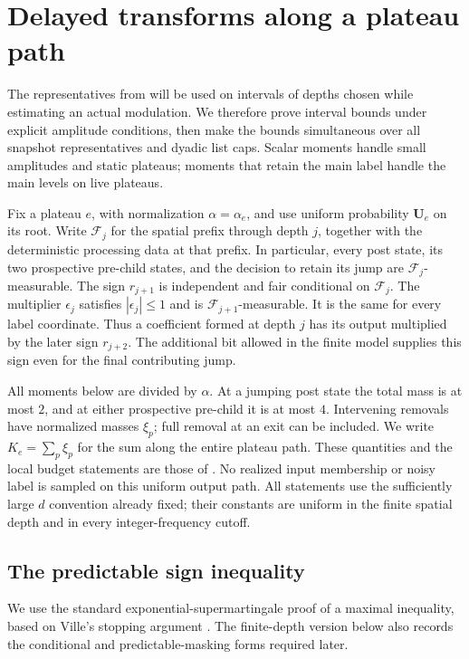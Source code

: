 \section{Delayed transforms along a plateau path}
\label{sec:paths}

The representatives from  will be used on intervals of
depths chosen while estimating an actual modulation. We therefore prove
interval bounds under explicit amplitude conditions, then make the bounds
simultaneous over all snapshot representatives and dyadic list caps.
Scalar moments handle small amplitudes and static plateaus; moments that
retain the main label handle the main levels on live plateaus.

Fix a plateau $e$, with normalization $\alpha=\alpha_e$, and use uniform
probability $\mathbf U_e$ on its root.  Write $\mathcal F_j$ for the spatial
prefix through depth $j$, together with the deterministic processing data at
that prefix.  In particular, every post state, its two prospective pre-child
states, and the decision to retain its jump are $\mathcal F_j$-measurable.
The sign $r_{j+1}$ is independent and fair conditional on $\mathcal F_j$.
The multiplier $\epsilon_j$ satisfies $|\epsilon_j|\le1$ and is
$\mathcal F_{j+1}$-measurable.  It is the same for every label coordinate.
Thus a coefficient formed at depth $j$ has its output multiplied by the
later sign $r_{j+2}$.  The additional bit allowed in the finite model supplies
this sign even for the final contributing jump.

All moments below are divided by $\alpha$.  At a jumping post state the
total mass is at most $2$, and at either prospective pre-child it is at
most $4$.  Intervening removals have normalized masses $\xi_p$; full removal
at an exit can be included.  We write $K_e=\sum_p\xi_p$ for the sum along
the entire plateau path.  These quantities and the local budget statements
are those of .  No realized input membership or
noisy label is sampled on this uniform output path.
All statements use the sufficiently large $d$ convention already fixed;
their constants are uniform in the finite spatial depth and in every
integer-frequency cutoff.

\subsection{The predictable sign inequality}

We use the standard exponential-supermartingale proof of a maximal
inequality, based on Ville's stopping argument
\cite[Chapter~V, first section, Theorem~1, pp.~84--85]{Ville1939}.
The finite-depth version below also records the conditional and
predictable-masking forms required later.

